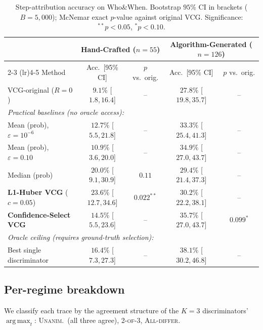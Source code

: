 \documentclass[11pt]{article}
\DeclareMathOperator*{\argmax}{arg\,max}
\begin{document}
\begin{table}[h]
\centering
\small
\caption{Step-attribution accuracy on Who\&When. Bootstrap $95\%$ CI in
brackets ($B = 5{,}000$); McNemar exact $p$-value against original VCG.
Significance: $^{**} p < 0.05$, $^{*} p < 0.10$.}
\label{tab:main}
\begin{tabular}{lcccc}
\toprule
& \multicolumn{2}{c}{Hand-Crafted ($n = 55$)} & \multicolumn{2}{c}{Algorithm-Generated ($n = 126$)} \\
\cmidrule(lr){2-3} \cmidrule(lr){4-5}
Method & Acc.\ [95\% CI] & $p$ vs.\ orig. & Acc.\ [95\% CI] & $p$ vs.\ orig. \\
\midrule
VCG-original ($R{=}0$)               & $9.1\%$ [$1.8, 16.4$]   & --      & $27.8\%$ [$19.8, 35.7$]  & --     \\
\midrule
\multicolumn{5}{l}{\textit{Practical baselines (no oracle access):}} \\
\;\; Mean (prob), $\varepsilon = 10^{-6}$  & $12.7\%$ [$5.5, 21.8$]  & --     & $33.3\%$ [$25.4, 41.3$]  & --     \\
\;\; Mean (prob), $\varepsilon = 0.10$     & $10.9\%$ [$3.6, 20.0$]  & --     & $34.9\%$ [$27.0, 43.7$]  & --     \\
\;\; Median (prob)                          & $20.0\%$ [$9.1, 30.9$]  & $0.11$ & $29.4\%$ [$21.4, 37.3$]  & --     \\
\;\; \textbf{L1-Huber VCG} ($c=0.05$)       & $\mathbf{23.6\%}$ [$12.7, 34.6$] & $\mathbf{0.022^{**}}$ & $30.2\%$ [$22.2, 38.1$]  & --     \\
\;\; \textbf{Confidence-Select VCG}         & $14.5\%$ [$5.5, 23.6$]  & --     & $\mathbf{35.7\%}$ [$27.0, 43.7$] & $\mathbf{0.099^{*}}$ \\
\midrule
\multicolumn{5}{l}{\textit{Oracle ceiling (requires ground-truth selection):}} \\
\;\; Best single discriminator               & $16.4\%$ [$7.3, 27.3$]  & --     & $38.1\%$ [$30.2, 46.8$]  & --     \\
\bottomrule
\end{tabular}
\end{table}

\subsection{Per-regime breakdown}

We classify each trace by the agreement structure of the $K = 3$
discriminators' $\argmax_t$: \textsc{Unanim.}\ (all three agree),
\textsc{2-of-3}, \textsc{All-differ}.
\end{document}
